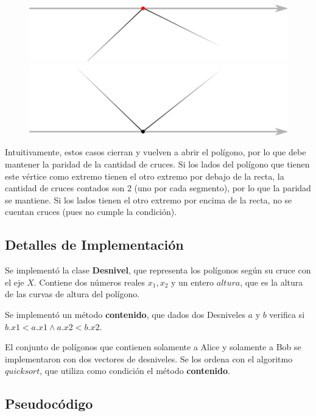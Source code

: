 \begin{itemize}
\begin{figure}[H]
\centering
\label{w_4y5}
\includegraphics[scale=0.8]{./figuras/w_4.png}
\includegraphics[scale=0.8]{./figuras/w_5.png}
\end{figure}

Intuitivamente, estos casos cierran y vuelven a abrir el polígono, por lo que debe mantener la paridad de
la cantidad de cruces. Si los lados del polígono que tienen este vértice como extremo tienen el otro extremo
por debajo de la recta, la cantidad de cruces contados son 2 (uno por cada segmento), por lo que la paridad se
mantiene. Si los lados tienen el otro extremo por encima de la recta, no se cuentan cruces (pues no cumple
la condición).
\end{itemize}

\subsection*{Detalles de Implementación}

Se implementó la clase \textbf{Desnivel}, que representa los polígonos según su cruce con el eje $X$.
Contiene dos números reales $x_1,x_2$ y un entero $altura$, que es la altura de las curvas de altura
del polígono.

Se implementó un método \textbf{contenido}, que dados dos Desniveles $a$ y $b$ verifica si
$b.x1 < a.x1 \wedge a.x2 < b.x2$.

El conjunto de polígonos que contienen solamente a Alice y solamente a Bob se
implementaron con dos vectores de desniveles. Se los ordena con el algoritmo
$quicksort$, que utiliza como condición el método \textbf{contenido}.

\subsection*{Pseudocódigo}

